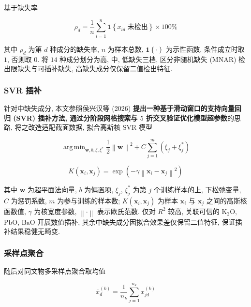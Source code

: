 \documentclass{ctexart}
\DeclareMathOperator*{\argmin}{arg\,min}
\begin{document}
基于缺失率

\begin{equation*}
\rho_{d}=\frac{1}{n}\sum_{i=1}^{n}\mathbf{1}\left\{x_{id}\;\text{未检出}\right\}\times100\%
\end{equation*}

其中 $\rho_d$ 为第 $d$ 种成分的缺失率, $n$ 为样本总数, $\mathbf{1}\left\{\cdot\right\}$ 为示性函数, 条件成立时取 $1$, 否则取 $0$. 将 $14$ 种成分划分为高, 中, 低缺失三档, 区分非随机缺失 (MNAR) 检出限缺失与可插补缺失, 高缺失成分仅保留二值检出特征.


\subsubsection{SVR 插补}

针对中缺失成分, 本文参照侯兴汉等 (2026) \textbf{提出一种基于滑动窗口的支持向量回归 (SVR) 插补方法, 通过分阶段网格搜索与 $5$ 折交叉验证优化模型超参数}的思路, 将之改造适配截面数据, 拟合高斯核 SVR 模型

\begin{equation*}
\argmin_{\boldsymbol{w},b,\xi,\xi^{*}}\frac{1}{2}\left\|\boldsymbol{w}\right\|^{2}+C\sum_{j=1}^{m}\left(\xi_{j}+\xi_{j}^{*}\right)
\end{equation*}

\begin{equation*}
K\left(\boldsymbol{x}_{i},\boldsymbol{x}_{j}\right)=\exp\left(-\gamma\left\|\boldsymbol{x}_{i}-\boldsymbol{x}_{j}\right\|^{2}\right)
\end{equation*}

其中 $\boldsymbol{w}$ 为超平面法向量, $b$ 为偏置项, $\xi_j$, $\xi_j^{*}$ 为第 $j$ 个训练样本的上, 下松弛变量, $C$ 为惩罚系数, $m$ 为参与训练的样本数; $K\left(\boldsymbol{x}_i,\boldsymbol{x}_j\right)$ 为样本 $\boldsymbol{x}_i$ 与 $\boldsymbol{x}_j$ 之间的高斯核函数值, $\gamma$ 为核宽度参数, $\left\|\cdot\right\|$ 表示欧氏范数. 仅对 $R^2$ 较高, 关联可信的 $\mathrm{K_2O}$, $\mathrm{PbO}$, $\mathrm{BaO}$ 开展数值插补, 其余中缺失成分因拟合效果差仅保留二值特征, 保证插补结果稳健无畸变.

\subsubsection{采样点聚合}

随后对同文物多采样点聚合取均值

\begin{equation*}
\overline{x}_{d}^{\left(k\right)}=\frac{1}{n_{k}}\sum_{j=1}^{n_{k}}x_{jd}^{\left(k\right)}
\end{equation*}
\end{document}
